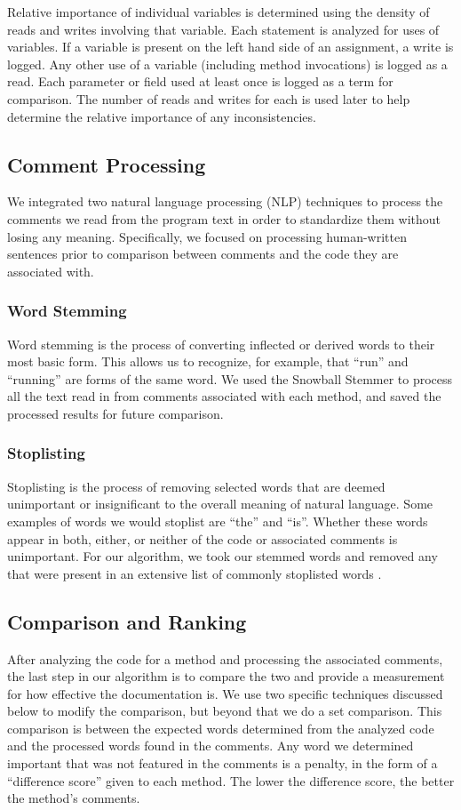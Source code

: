 \documentclass[preprint]{sigplanconf}
\begin{document}
Relative importance of individual variables is determined using the density of reads and writes involving that variable. Each statement is analyzed for uses of variables. If a variable is present on the left hand side of an assignment, a write is logged. Any other use of a variable (including method invocations) is logged as a read. Each parameter or field used at least once is logged as a term for comparison. The number of reads and writes for each is used later to help determine the relative importance of any inconsistencies.

\subsection{Comment Processing}
We integrated two natural language processing (NLP) techniques to process the comments we read from the program text in order to standardize them without losing any meaning. Specifically, we focused on processing human-written sentences prior to comparison between comments and the code they are associated with.

\subsubsection{Word Stemming}
Word stemming is the process of converting inflected or derived words to their most basic form. This allows us to recognize, for example, that ``run'' and ``running'' are forms of the same word. We used the Snowball Stemmer to process all the text read in from comments associated with each method, and saved the processed results for future comparison.

\subsubsection{Stoplisting}
Stoplisting is the process of removing selected words that are deemed unimportant or insignificant to the overall meaning of natural language. Some examples of words we would stoplist are ``the'' and ``is''. Whether these words appear in both, either, or neither of the code or associated comments is unimportant. For our algorithm, we took our stemmed words and removed any that were present in an extensive list of commonly stoplisted words \cite{xpo6}.

\subsection{Comparison and Ranking}
After analyzing the code for a method and processing the associated comments, the last step in our algorithm is to compare the two and provide a measurement for how effective the documentation is. We use two specific techniques discussed below to modify the comparison, but beyond that we do a set comparison.
This comparison is between the expected words determined from the analyzed code and the processed words found in the comments. Any word we determined important that was not featured in the comments is a penalty, in the form of a ``difference score'' given to each method. The lower the difference score, the better the method's comments.
\end{document}
